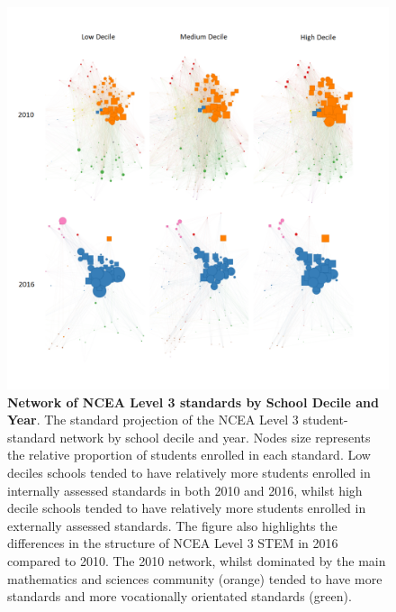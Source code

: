 \documentclass[a4paper]{article}
\begin{document}
\begin{landscape}
\begin{figure}[h]
    \centering
    \includegraphics{L3NCEA_STEM_Network_Year_Decile.png}
    \caption{\textbf{Network of NCEA Level 3 standards by School Decile and Year}. The standard projection of the NCEA Level 3 student-standard network by school decile and year. Nodes size represents the relative proportion of students enrolled in each standard. Low deciles schools tended to have relatively more students enrolled in internally assessed standards in both 2010 and 2016, whilst high decile schools tended to have relatively more students enrolled in externally assessed standards. The figure also highlights the differences in the structure of NCEA Level 3 STEM in 2016 compared to 2010. The 2010 network, whilst dominated by the main mathematics and sciences community (orange) tended to have more standards and more vocationally orientated standards (green).  
    }
    
    \label{fig:NetworkDecile}
\end{figure}
\end{landscape}
\end{document}
